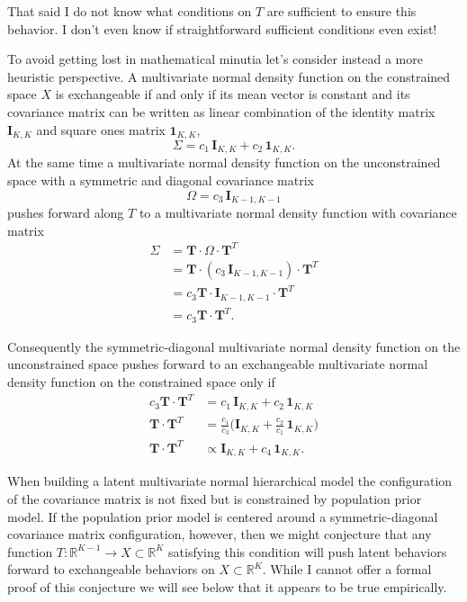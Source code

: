 \documentclass[
  letterpaper,
  DIV=11,
  numbers=noendperiod]{scrartcl}
\begin{document}
That said I do not know what conditions on \(T\) are sufficient to
ensure this behavior. I don't even know if straightforward sufficient
conditions even exist!

To avoid getting lost in mathematical minutia let's consider instead a
more heuristic perspective. A multivariate normal density function on
the constrained space \(X\) is exchangeable if and only if its mean
vector is constant and its covariance matrix can be written as linear
combination of the identity matrix \(\mathbf{I}_{K, K}\) and square ones
matrix \(\mathbf{1}_{K, K}\), \[
\Sigma = c_{1} \, \mathbf{I}_{K, K} + c_{2} \, \mathbf{1}_{K, K}.
\] At the same time a multivariate normal density function on the
unconstrained space with a symmetric and diagonal covariance matrix \[
\Omega = c_{3} \, \mathbf{I}_{K - 1, K - 1}
\] pushes forward along \(T\) to a multivariate normal density function
with covariance matrix \begin{align*}
\Sigma
&=
\mathbf{T} \cdot \Omega \cdot \mathbf{T}^{T}
\\
&=
\mathbf{T} \cdot ( c_{3} \, \mathbf{I}_{K - 1, K - 1} ) \cdot \mathbf{T}^{T}
\\
&=
c_{3} \mathbf{T} \cdot \mathbf{I}_{K - 1, K - 1} \cdot \mathbf{T}^{T}
\\
&=
c_{3} \mathbf{T} \cdot \mathbf{T}^{T}.
\end{align*}

Consequently the symmetric-diagonal multivariate normal density function
on the unconstrained space pushes forward to an exchangeable
multivariate normal density function on the constrained space only if
\begin{align*}
c_{3} \mathbf{T} \cdot \mathbf{T}^{T}
&=
c_{1} \, \mathbf{I}_{K, K} + c_{2} \, \mathbf{1}_{K, K}
\\
\mathbf{T} \cdot \mathbf{T}^{T}
&=
\frac{c_{1}}{c_{3}} \bigg( \mathbf{I}_{K, K}
+ \frac{c_{2}}{c_{1}} \, \mathbf{1}_{K, K} \bigg)
\\
\mathbf{T} \cdot \mathbf{T}^{T}
&\propto
\mathbf{I}_{K, K} + c_{4} \, \mathbf{1}_{K, K}.
\end{align*}

When building a latent multivariate normal hierarchical model the
configuration of the covariance matrix is not fixed but is constrained
by population prior model. If the population prior model is centered
around a symmetric-diagonal covariance matrix configuration, however,
then we might conjecture that any function
\(T : \mathbb{R}^{K - 1} \rightarrow X \subset \mathbb{R}^{K}\)
satisfying this condition will push latent behaviors forward to
exchangeable behaviors on \(X \subset \mathbb{R}^{K}\). While I cannot
offer a formal proof of this conjecture we will see below that it
appears to be true empirically.
\end{document}
